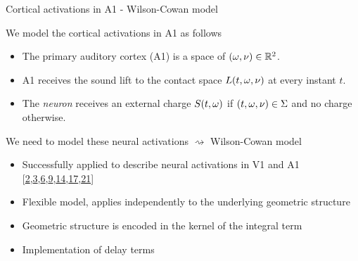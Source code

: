\documentclass[10pt,american,ignorenonframetext,aspectratio=1610]{beamer}
\providecommand{\tightlist}{%
  \setlength{\itemsep}{0pt}\setlength{\parskip}{0pt}}
\theoremstyle{remark}
\begin{document}
\begin{frame}{Cortical activations in A1 - Wilson-Cowan model}
\protect\hypertarget{cortical-activations-in-a1---wilson-cowan-model}{}

We model the cortical activations in A1 as follows

\begin{itemize}
\tightlist
\item
  The primary auditory cortex (A1) is a space of \((\omega,\nu)\in\mathbb{R}^2\).
\item
  A1 receives the sound lift to the contact space \(L(t,\omega,\nu)\) at
  every instant \(t\).
\item
  The \emph{neuron} receives an external charge \(S(t,\omega)\) if
  \((t,\omega,\nu)\in\Sigma\) and no charge otherwise.
\end{itemize}

We need to model these neural activations \(\rightsquigarrow\)
Wilson-Cowan model

\begin{itemize}
\tightlist
\item
  Successfully applied to describe neural activations in V1 and A1
  {[}\protect\hyperlink{ref-bertalmio2018}{2},\protect\hyperlink{ref-boscain2017}{3},\protect\hyperlink{ref-bressloff2002a}{6},\protect\hyperlink{ref-ermentrout1979}{9},\protect\hyperlink{ref-loebel2007}{14},\protect\hyperlink{ref-rankin2015}{17},\protect\hyperlink{ref-zulfiqar2019}{21}{]}
\item
  Flexible model, applies independently to the underlying geometric
  structure
\item
  Geometric structure is encoded in the kernel of the integral term
\item
  Implementation of delay terms
\end{itemize}

\end{frame}
\end{document}
